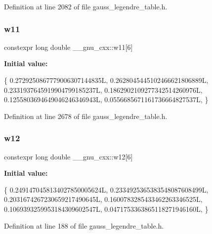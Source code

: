 Definition at line 2082 of file gauss\+\_\+legendre\+\_\+table.\+h.

\mbox{\label{namespace____gnu__cxx_a01d11bac6e90e340d0594517fe76c751}} 
\subsubsection{\texorpdfstring{w11}{w11}}
{\footnotesize\ttfamily constexpr long double \+\_\+\+\_\+gnu\+\_\+cxx\+::w11\mbox{[}6\mbox{]}}

{\bfseries Initial value\+:}
\begin{DoxyCode}
\{
    0.2729250867779006307144835L,
    0.2628045445102466621806889L,
    0.2331937645919904799185237L,
    0.1862902109277342514260976L,
    0.1255803694649046246346943L,
    0.0556685671161736664827537L,
  \}
\end{DoxyCode}


Definition at line 2678 of file gauss\+\_\+legendre\+\_\+table.\+h.

\mbox{\label{namespace____gnu__cxx_ae4bc25ed69411a1449962559460c3b83}} 
\subsubsection{\texorpdfstring{w12}{w12}}
{\footnotesize\ttfamily constexpr long double \+\_\+\+\_\+gnu\+\_\+cxx\+::w12\mbox{[}6\mbox{]}}

{\bfseries Initial value\+:}
\begin{DoxyCode}
\{
    0.2491470458134027850005624L,
    0.2334925365383548087608499L,
    0.2031674267230659217490645L,
    0.1600783285433462263346525L,
    0.1069393259953184309602547L,
    0.0471753363865118271946160L,
  \}
\end{DoxyCode}


Definition at line 188 of file gauss\+\_\+legendre\+\_\+table.\+h.

\mbox{\label{namespace____gnu__cxx_a41570e73743d8e9ce680ec4a2b627da5}} 
